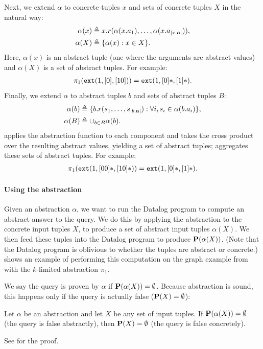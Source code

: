 Next, we extend $\alpha$ to concrete tuples $x$ and sets of concrete tuples $X$
in the natural way:
\begin{align}
\alpha(x) &\triangleq x.r(\alpha(x.a_1), \dots, \alpha(x.a_{|x.\mathbf{a}|})), \\
\alpha(X) &\triangleq \{ \alpha(x) : x \in X \}.
\end{align}
Here, $\alpha(x)$ is an abstract tuple (one where the arguments are abstract values)
and $\alpha(X)$ is a set of abstract tuples.
For example:
\begin{align}
\pi_1(\text{\tt ext}(1, [0], [10])) = \text{\tt ext}(1, [0]*, [1]*). \nonumber
\end{align}
Finally, we extend $\alpha$ to abstract tuples $b$ and sets of abstract tuples $B$:
\begin{align}
\alpha(b) &\triangleq \{ b.r(s_1, \dots, s_{|b.\mathbf{a}|}) : \forall i, s_i \in \alpha(b.a_i) \}, \label{eqn:alphab} \\
\alpha(B) &\triangleq \cup_{b \in B} \alpha(b). \label{eqn:alphaB}
\end{align}
 applies the abstraction function to each component and takes the cross product over the resulting abstract values,
yielding a set of abstract tuples;
 aggregates these sets of abstract tuples.
For example:
\begin{align}
\pi_1(\text{\tt ext}(1, [00]*, [10]*)) = \text{\tt ext}(1, [0]*, [1]*). \nonumber
\end{align}

\paragraph{Using the abstraction}

Given an abstraction $\alpha$,
we want to run the Datalog program to compute an abstract answer to the query.
We do this by applying the abstraction to the concrete input tuples $X$,
to produce a set of abstract input tuples $\alpha(X)$.
We then feed these tuples into the Datalog program to produce $\mathbf{P}(\alpha(X))$.
(Note that the Datalog program is oblivious to whether the tuples are abstract or concrete.)
 shows an example of performing this computation on the
graph example from  with the $k$-limited abstraction $\pi_1$.

We say the query is proven by $\alpha$ if $\mathbf{P}(\alpha(X)) = \emptyset$.
Because abstraction is sound,
this happens only if the query is actually false ($\mathbf{P}(X) = \emptyset$):
\begin{proposition}
\label{prop:soundness}
Let $\alpha$ be an abstraction and let $X$ be any set of input tuples.
If $\mathbf{P}(\alpha(X)) = \emptyset$ (the query is false abstractly),
then $\mathbf{P}(X) = \emptyset$ (the query is false concretely).
\end{proposition}
See  for the proof.

